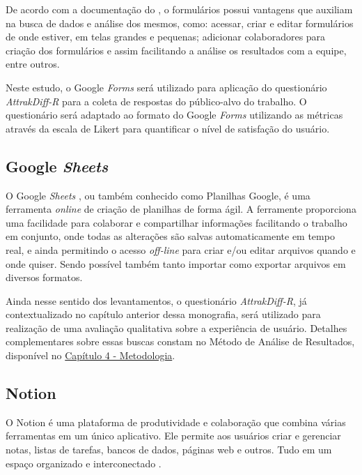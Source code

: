 De acordo com a documentação do , o formulários possui vantagens que auxiliam na busca de dados e análise dos mesmos, como: acessar, criar e editar formulários de onde estiver, em telas grandes e pequenas; adicionar colaboradores para criação dos formulários e assim facilitando a análise os resultados com a equipe, entre outros.

Neste estudo, o Google \textit{Forms} será utilizado para aplicação do questionário \textit{AttrakDiff-R} para a coleta de respostas do público-alvo do trabalho. O questionário será adaptado ao formato do Google \textit{Forms} utilizando as métricas através da escala de Likert para quantificar o nível de satisfação do usuário.


\subsection{Google \textit{Sheets}}
    \label{GoogleSheets}

O Google \textit{Sheets} \cite{GoogleSheets}, ou também conhecido como Planilhas Google, é uma ferramenta \textit{online} de criação de planilhas de forma ágil. A ferramente proporciona uma facilidade para colaborar e compartilhar informações facilitando o trabalho em conjunto, onde todas as alterações são salvas automaticamente em tempo real, e ainda permitindo o acesso \textit{off-line} para criar e/ou editar arquivos quando e onde quiser. Sendo possível também tanto importar como exportar arquivos em diversos formatos.

Ainda nesse sentido dos levantamentos, o questionário \textit{AttrakDiff-R}, já contextualizado no capítulo anterior dessa monografia, será utilizado para realização de uma avaliação qualitativa sobre a experiência de usuário. Detalhes complementares sobre essas buscas constam no Método de Análise de Resultados, disponível no \hyperref[chap:Metodologia]{Capítulo 4 - Metodologia}.


\subsection{Notion}
    \label{Notion}

O Notion é uma plataforma de produtividade e colaboração que combina várias ferramentas em um único aplicativo. Ele permite aos usuários criar e gerenciar notas, listas de tarefas, bancos de dados, páginas web e outros. Tudo em um espaço organizado e interconectado \cite{Notion}.

